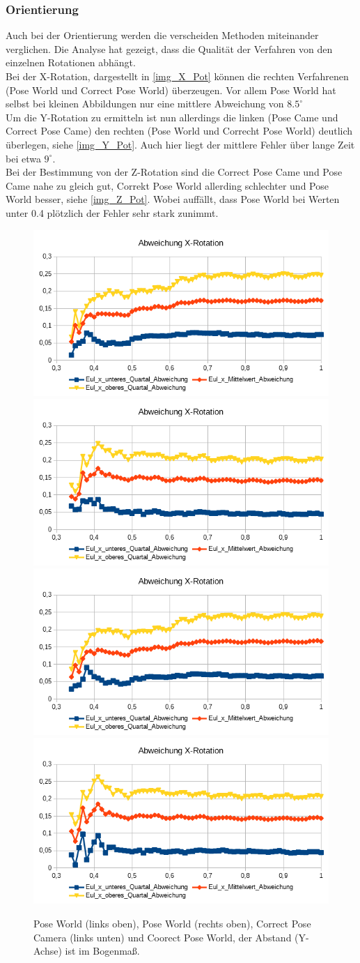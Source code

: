\subsubsection{Orientierung}
Auch bei der Orientierung werden die verscheiden Methoden miteinander verglichen. Die Analyse hat gezeigt, dass die Qualität der Verfahren von den einzelnen Rotationen abhängt.\\
Bei der X-Rotation, dargestellt in \autoref{img_X_Pot} können die rechten Verfahrenen (Pose World und Correct Pose World) überzeugen. Vor allem Pose World hat selbst bei kleinen Abbildungen nur eine mittlere Abweichung von $8.5^\circ$\\
Um die Y-Rotation zu ermitteln ist nun allerdings die linken (Pose Came und Correct Pose Came) den rechten (Pose World und Correcht Pose World) deutlich überlegen, siehe \autoref{img_Y_Pot}. Auch hier liegt der mittlere Fehler über lange Zeit bei etwa $9^\circ$.\\
Bei der Bestimmung von der Z-Rotation sind die Correct Pose Came und Pose Came nahe zu gleich gut, Correkt Pose World allerding schlechter und Pose World besser, siehe \autoref{img_Z_Pot}. Wobei auffällt, dass Pose World bei Werten unter 0.4 plötzlich der Fehler sehr stark zunimmt.
\begin{figure}
	\centering
	\includegraphics[width=0.45\linewidth]{tabelle/X_Rot_PC}
	\includegraphics[width=0.45\linewidth]{tabelle/X_Rot_PW}
	\includegraphics[width=0.45\linewidth]{tabelle/X_Rot_CPC}
	\includegraphics[width=0.45\linewidth]{tabelle/X_Rot_CPW}
	\caption{Pose World (links oben), Pose World (rechts oben), Correct Pose Camera (links unten) und Coorect Pose World, der Abstand (Y-Achse) ist im Bogenmaß.}
	\label{img_X_Pot}
\end{figure}
